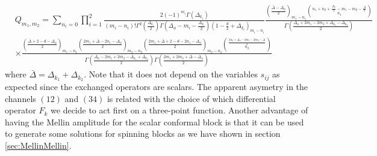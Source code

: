 \begin{align}
   & Q_{m_1,m_2}=\sum_{n_i=0}\prod_{i=1}^2\tfrac{2(-1)^{m_i} \Gamma \left(\Delta _{k_i}\right) }{ \left(m_i-n_i\right)! \Gamma^2 \left(\frac{\Delta _{k_i}}{2}\right) \Gamma \left(\Delta_{\phi}-m_i-\frac{\Delta _{k_i}}{2}\right)  \left(1-\frac{d }{2}+\Delta _{k_i}\right)_{m_i-n_i}  }\tfrac{\left(\frac{\bar{\Delta} -\Delta_{\phi} }{2} \right)_{m_1-n_1} \binom{n_1+n_2+\frac{\Delta_{\phi}}{2}-m_1-m_2-\frac{\bar{\Delta} }{2}  }{n_1}}{   \Gamma \left(\frac{\Delta_{\phi}+2 m_1-2 m_2+\Delta _{k_1}-\Delta _{k_2}}{2} \right)  }\nonumber \\
   & \times\tfrac{ \left(\frac{\bar{\Delta}+2-d -\Delta_{\phi}}{2} \right)_{m_1-n_1} \left(\frac{2 m_1+\bar{\Delta}-2 n_1-\Delta_{\phi}}{2}  \right)_{m_2-n_2} \left(\frac{2 m_1+\bar{\Delta}+2 -d -2 n_1-\Delta_{\phi}}{2}  \right)_{m_2-n_2} \binom{\frac{2 n_2+\Delta_{\phi}-2 m_1-2 m_2-\bar{\Delta} }{2} }{n_2}  }{   \Gamma \left(\frac{\Delta_{\phi}-2 m_1+2 m_2-\Delta _{k_1}+\Delta _{k_2} }{2} \right) \Gamma \left(\frac{2 m_1+2 m_2+\bar{\Delta} -\Delta_{\phi}}{2} \right) }\label{eq:ScalarblockMellin}
\end{align}
where $\bar{\Delta}=\Delta_{k_1}+\Delta_{k_2}$. Note that it does not depend on the variables $s_{ij}$ as expected since the exchanged operators are scalars. The apparent asymetry in the channels $(12)$ and $(34)$ is related with the choice of which differential operator $F_k$ we decide to act first on a three-point function. Another advantage of having the Mellin amplitude for the scalar conformal block is that it can be used to generate some solutions for spinning blocks as we have shown in section \ref{sec:MellinMellin}.

